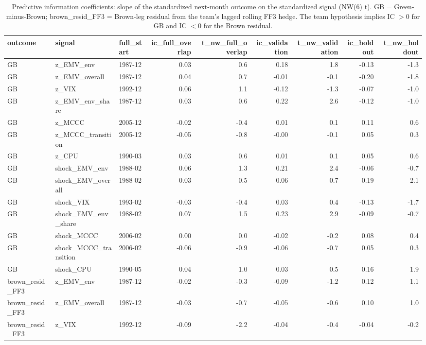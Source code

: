 \begin{table}
\caption{Predictive information coefficients: slope of the standardized next-month outcome on the standardized signal (NW(6) t). GB = Green-minus-Brown; brown\_resid\_FF3 = Brown-leg residual from the team's lagged rolling FF3 hedge. The team hypothesis implies IC $>0$ for GB and IC $<0$ for the Brown residual.}
\label{tab:m1_ic}
\begin{tabular}{lllrrrrrr}
\toprule
outcome & signal & full\_start & ic\_full\_overlap & t\_nw\_full\_overlap & ic\_validation & t\_nw\_validation & ic\_holdout & t\_nw\_holdout \\
\midrule
GB & z\_EMV\_env & 1987-12 & 0.03 & 0.6 & 0.18 & 1.8 & -0.13 & -1.3 \\
GB & z\_EMV\_overall & 1987-12 & 0.04 & 0.7 & -0.01 & -0.1 & -0.20 & -1.8 \\
GB & z\_VIX & 1992-12 & 0.06 & 1.1 & -0.12 & -1.3 & -0.07 & -1.0 \\
GB & z\_EMV\_env\_share & 1987-12 & 0.03 & 0.6 & 0.22 & 2.6 & -0.12 & -1.0 \\
GB & z\_MCCC & 2005-12 & -0.02 & -0.4 & 0.01 & 0.1 & 0.11 & 0.6 \\
GB & z\_MCCC\_transition & 2005-12 & -0.05 & -0.8 & -0.00 & -0.1 & 0.05 & 0.3 \\
GB & z\_CPU & 1990-03 & 0.03 & 0.6 & 0.01 & 0.1 & 0.05 & 0.6 \\
GB & shock\_EMV\_env & 1988-02 & 0.06 & 1.3 & 0.21 & 2.4 & -0.06 & -0.7 \\
GB & shock\_EMV\_overall & 1988-02 & -0.03 & -0.5 & 0.06 & 0.7 & -0.19 & -2.1 \\
GB & shock\_VIX & 1993-02 & -0.03 & -0.4 & 0.03 & 0.4 & -0.13 & -1.7 \\
GB & shock\_EMV\_env\_share & 1988-02 & 0.07 & 1.5 & 0.23 & 2.9 & -0.09 & -0.7 \\
GB & shock\_MCCC & 2006-02 & 0.00 & 0.0 & -0.02 & -0.2 & 0.08 & 0.4 \\
GB & shock\_MCCC\_transition & 2006-02 & -0.06 & -0.9 & -0.06 & -0.7 & 0.05 & 0.3 \\
GB & shock\_CPU & 1990-05 & 0.04 & 1.0 & 0.03 & 0.5 & 0.16 & 1.9 \\
brown\_resid\_FF3 & z\_EMV\_env & 1987-12 & -0.02 & -0.3 & -0.09 & -1.2 & 0.12 & 1.1 \\
brown\_resid\_FF3 & z\_EMV\_overall & 1987-12 & -0.03 & -0.7 & -0.05 & -0.6 & 0.10 & 1.0 \\
brown\_resid\_FF3 & z\_VIX & 1992-12 & -0.09 & -2.2 & -0.04 & -0.4 & -0.04 & -0.2 \\

\end{tabular}
\end{table}
